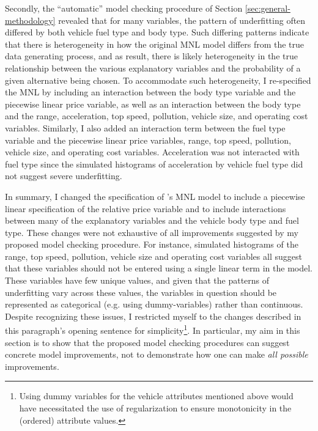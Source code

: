 \documentclass[preprint]{elsarticle}
\begin{document}
Secondly, the ``automatic'' model checking procedure of Section \ref{sec:general-methodology} revealed that for many variables, the pattern of underfitting often differed by both vehicle fuel type and body type. Such differing patterns indicate that there is heterogeneity in how the original MNL model differs from the true data generating process, and as result, there is likely heterogeneity in the true relationship between the various explanatory variables and the probability of a given alternative being chosen. To accommodate such heterogeneity, I re-specified the MNL by including an interaction between the body type variable and the piecewise linear price variable, as well as an interaction between the body type and the range, acceleration, top speed, pollution, vehicle size, and operating cost variables. Similarly, I also added an interaction term between the fuel type variable and the piecewise linear price variables, range, top speed, pollution, vehicle size, and operating cost variables. Acceleration was not interacted with fuel type since the simulated histograms of acceleration by vehicle fuel type did not suggest severe underfitting.

In summary, I changed the specification of \citeauthor{brownstone_forecasting_1998}'s MNL model to include a piecewise linear specification of the relative price variable and to include interactions between many of the explanatory variables and the vehicle body type and fuel type. These changes were not exhaustive of all improvements suggested by my proposed model checking procedure. For instance, simulated histograms of the range, top speed, pollution, vehicle size and operating cost variables all suggest that these variables should not be entered using a single linear term in the model. These variables have few unique values, and given that the patterns of underfitting vary across these values, the variables in question should be represented as categorical (e.g. using dummy-variables) rather than continuous. Despite recognizing these issues, I restricted myself to the changes described in this paragraph's opening sentence for simplicity\footnote{Using dummy variables for the vehicle attributes mentioned above would have necessitated the use of regularization to ensure monotonicity in the (ordered) attribute values.}. In particular, my aim in this section is to show that the proposed model checking procedures can suggest concrete model improvements, not to demonstrate how one can make \textit{all possible} improvements.
\end{document}
